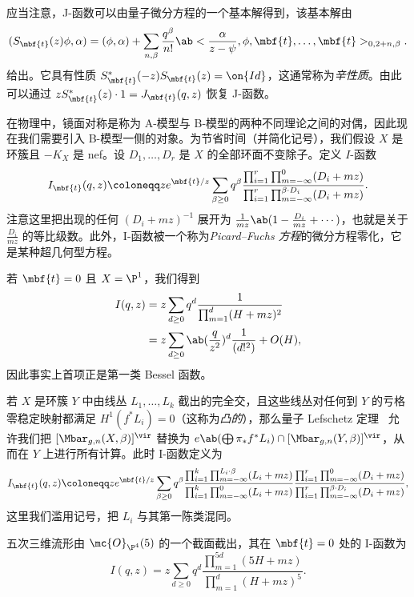 应当注意，J-函数可以由量子微分方程的一个基本解得到，该基本解由
\[ ( S_{\mbf{t}}(z) \phi , \alpha) = (\phi, \alpha) + \sum_{n, \beta} \frac{q^{\beta}}{n!} \ab<\frac{\alpha}{z-\psi}, \phi, \mbf{t}, \ldots, \mbf{t}>_{0, 2+n, \beta}. \]
给出。它具有性质 \(S_{\mbf{t}}^*(-z) S_{\mbf{t}}(z) = \on{Id}\)，这通常称为\textit{辛性质}。由此可以通过 \(z S_{\mbf{t}}^*(z)\cdot 1 = J_{\mbf{t}}(q, z)\) 恢复 J-函数。

在物理中，镜面对称是称为 A-模型与 B-模型的两种不同理论之间的对偶，因此现在我们需要引入 B-模型一侧的对象。为节省时间（并简化记号），我们假设 \(X\) 是环簇且 \(-K_X\) 是 nef。设 \(D_1, \ldots, D_r\) 是 \(X\) 的全部环面不变除子。定义 \(I\)-函数
\[
    I_{\mbf{t}}(q, z) \coloneqq z e^{\mbf{t}/z} \sum_{\beta \geq 0} q^{\beta} \frac{\prod_{i=1}^r \prod_{m = -\infty}^{0} (D_i + mz)}{\prod_{i=1}^r \prod_{m=-\infty}^{\beta \cdot D_i} (D_i + mz)}.
\]
注意这里把出现的任何 \((D_i + mz)^{-1}\) 展开为 \(\frac{1}{mz} \ab(1 - \frac{D_i}{mz} + \cdots)\)，也就是关于 \(\frac{D_i}{mz}\) 的等比级数。此外，I-函数被一个称为\textit{Picard--Fuchs 方程}的微分方程零化，它是某种超几何型方程。

\begin{exm}
    若 \(\mbf{t} = 0\) 且 \(X = \P^1\)，我们得到
    \begin{align*}
        I(q,z) &= z\sum_{d \geq 0} q^d \frac{1}{\prod_{m=1}^d (H + mz)^2} \\
        &= z\sum_{d \geq 0} \ab(\frac{q}{z^2})^d \frac{1}{(d!^2)} + O(H),
    \end{align*}
    因此事实上首项正是第一类 Bessel 函数。
\end{exm}

若 \(X\) 是环簇 \(Y\) 中由线丛 \(L_1, \ldots, L_k\) 截出的完全交，且这些线丛对任何到 \(Y\) 的亏格零稳定映射都满足 \(H^1(f^* L_i) = 0\)（这称为\textit{凸的}），那么量子 Lefschetz 定理~\cite{CoatesGivental2007} 允许我们把 \([\Mbar_{g,n}(X, \beta)]^{\vir}\) 替换为 \(e\ab(\bigoplus \pi_* f^* L_i) \cap [\Mbar_{g,n}(Y, \beta)]^{\vir}\)，从而在 \(Y\) 上进行所有计算。此时 I-函数定义为
\[
    I_{\mbf{t}}(q,z) \coloneqq z e^{\mbf{t}/z} \sum_{\beta \geq 0} q^{\beta} \frac{\prod_{i=1}^k \prod_{m=-\infty}^{L_i \cdot \beta} (L_i + mz)}{\prod_{i=1}^k \prod_{m=-\infty}^{0} (L_i + mz)} \frac{\prod_{i=1}^r \prod_{m = -\infty}^{0} (D_i + mz)}{\prod_{i=1}^r \prod_{m=-\infty}^{\beta \cdot D_i} (D_i + mz)},
\]
这里我们滥用记号，把 \(L_i\) 与其第一陈类混同。

\begin{exm}
    五次三维流形由 \(\mc{O}_{\P^4}(5)\) 的一个截面截出，其在 \(\mbf{t} = 0\) 处的 I-函数为
    \[ I(q,z) = z \sum_{d \geq 0} q^d \frac{\prod_{m=1}^{5d}(5H+mz)}{\prod_{m=1}^d (H+mz)^5}. \]
\end{exm}

